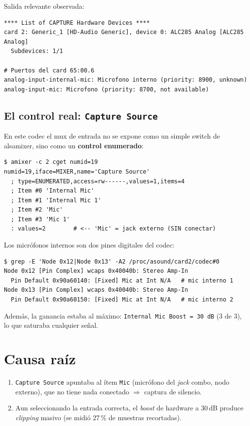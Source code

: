 \documentclass[12pt,a4paper]{article}
\begin{document}
Salida relevante observada:

\begin{lstlisting}[style=bash]
**** List of CAPTURE Hardware Devices ****
card 2: Generic_1 [HD-Audio Generic], device 0: ALC285 Analog [ALC285 Analog]
  Subdevices: 1/1

# Puertos del card 65:00.6
analog-input-internal-mic: Microfono interno (priority: 8900, unknown)
analog-input-mic: Microfono (priority: 8700, not available)
\end{lstlisting}

\subsection{El control real: \texttt{Capture Source}}

En este codec el mux de entrada no se expone como un simple switch de
alsa\-mixer, sino como un \textbf{control enumerado}:

\begin{lstlisting}[style=bash]
$ amixer -c 2 cget numid=19
numid=19,iface=MIXER,name='Capture Source'
  ; type=ENUMERATED,access=rw------,values=1,items=4
  ; Item #0 'Internal Mic'
  ; Item #1 'Internal Mic 1'
  ; Item #2 'Mic'
  ; Item #3 'Mic 1'
  : values=2        # <-- 'Mic' = jack externo (SIN conectar)
\end{lstlisting}

Los micrófonos internos son dos pines digitales del codec:

\begin{lstlisting}[style=bash]
$ grep -E 'Node 0x12|Node 0x13' -A2 /proc/asound/card2/codec#0
Node 0x12 [Pin Complex] wcaps 0x40040b: Stereo Amp-In
  Pin Default 0x90a60140: [Fixed] Mic at Int N/A   # mic interno 1
Node 0x13 [Pin Complex] wcaps 0x40040b: Stereo Amp-In
  Pin Default 0x90a60150: [Fixed] Mic at Int N/A   # mic interno 2
\end{lstlisting}

Además, la ganancia estaba al máximo: \texttt{Internal Mic Boost = 30\,dB}
(3 de 3), lo que saturaba cualquier señal.

\section{Causa raíz}

\begin{enumerate}
  \item \texttt{Capture Source} apuntaba al ítem \texttt{Mic}
        (micrófono del \emph{jack} combo, nodo externo), que no tiene nada
        conectado $\Rightarrow$ captura de silencio.
  \item Aun seleccionando la entrada correcta, el \emph{boost} de hardware a
        30\,dB produce \emph{clipping} masivo (se midió 27\,\% de muestras
        recortadas).
\end{enumerate}
\end{document}
